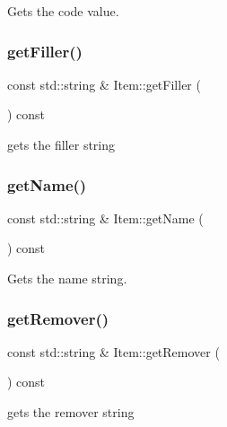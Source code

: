 Gets the code value. 

\mbox{\label{class_item_a67903e1bcdd09d0857295a33b5fbeb6b}} 
\subsubsection{\texorpdfstring{get\+Filler()}{getFiller()}}
{\footnotesize\ttfamily const std\+::string \& Item\+::get\+Filler (\begin{DoxyParamCaption}{ }\end{DoxyParamCaption}) const}



gets the filler string 

\mbox{\label{class_item_a906722df9ab3f424d32c4106ff64aa15}} 
\subsubsection{\texorpdfstring{get\+Name()}{getName()}}
{\footnotesize\ttfamily const std\+::string \& Item\+::get\+Name (\begin{DoxyParamCaption}{ }\end{DoxyParamCaption}) const}



Gets the name string. 

\mbox{\label{class_item_a259c9f359ed2378aae4cbb5ea53bef18}} 
\subsubsection{\texorpdfstring{get\+Remover()}{getRemover()}}
{\footnotesize\ttfamily const std\+::string \& Item\+::get\+Remover (\begin{DoxyParamCaption}{ }\end{DoxyParamCaption}) const}



gets the remover string 

\mbox{\label{class_item_a818f9273ed8889c8b27cb97d2c292e77}} 
